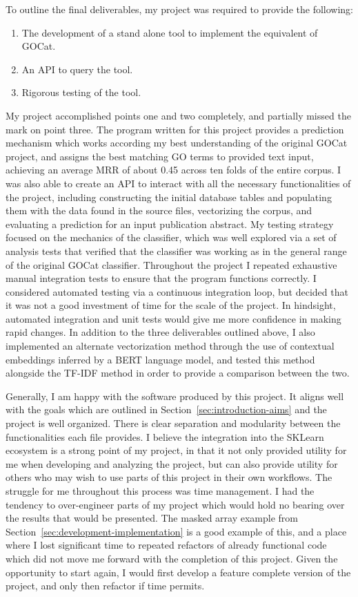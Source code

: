\documentclass[11pt]{article}
\theoremstyle{plain}
\theoremstyle{definition}
\begin{document}
To outline the final deliverables, my project was required to provide the following:
\begin{enumerate}
    \item The development of a stand alone tool to implement the equivalent of GOCat.
    \item An API to query the tool.
    \item Rigorous testing of the tool.
\end{enumerate}

My project accomplished points one and two completely, and partially missed the mark on point three. The program written for this project provides a prediction mechanism which works according my best understanding of the original GOCat project, and assigns the best matching GO terms to provided text input, achieving an average MRR of about 0.45 across ten folds of the entire corpus. I was also able to create an API to interact with all the necessary functionalities of the project, including constructing the initial database tables and populating them with the data found in the source files, vectorizing the corpus, and evaluating a prediction for an input publication abstract. My testing strategy focused on the mechanics of the classifier, which was well explored via a set of analysis tests that verified that the classifier was working as in the general range of the original GOCat classifier. Throughout the project I repeated exhaustive manual integration tests to ensure that the program functions correctly. I considered automated testing via a continuous integration loop, but decided that it was not a good investment of time for the scale of the project. In hindsight, automated integration and unit tests would give me more confidence in making rapid changes. In addition to the three deliverables outlined above, I also implemented an alternate vectorization method through the use of contextual embeddings inferred by a BERT language model, and tested this method alongside the TF-IDF method in order to provide a comparison between the two.

Generally, I am happy with the software produced by this project. It aligns well with the goals which are outlined in Section~\ref{sec:introduction-aims} and the project is well organized. There is clear separation and modularity between the functionalities each file provides. I believe the integration into the SKLearn ecosystem is a strong point of my project, in that it not only provided utility for me when developing and analyzing the project, but can also provide utility for others who may wish to use parts of this project in their own workflows. The struggle for me throughout this process was time management. I had the tendency to over-engineer parts of my project which would hold no bearing over the results that would be presented. The masked array example from Section~\ref{sec:development-implementation} is a good example of this, and a place where I lost significant time to repeated refactors of already functional code which did not move me forward with the completion of this project. Given the opportunity to start again, I would first develop a feature complete version of the project, and only then refactor if time permits.
\end{document}
